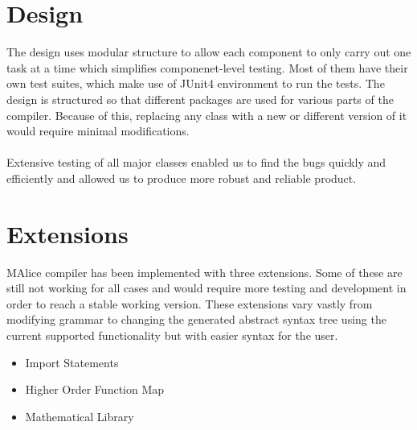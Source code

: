 \documentclass[a4wide, 11pt]{article}
\begin{document}
		
\section{Design}
	The design uses modular structure to allow each component to only carry out one task at a time which simplifies componenet-level testing. Most of them have their own test suites, which make use of JUnit4 environment to run the tests. The design is structured so that different packages are used for various parts of the compiler. Because of this, replacing any class with a new or different version of it would require minimal modifications.
	\\
	\\
	Extensive testing of all major classes enabled us to find the bugs quickly and efficiently and allowed us to produce more robust and reliable product.

\section{Extensions}
	MAlice compiler has been implemented with three extensions. Some of these are still not working for all cases and would require more testing and development in order to reach a stable working version. These extensions vary vastly from modifying grammar to changing the generated abstract syntax tree using the current supported functionality but with easier syntax for the user.
	\begin{itemize}
		\item Import Statements
		\item Higher Order Function Map
		\item Mathematical Library
	\end{itemize}
\end{document}
